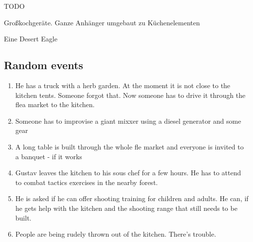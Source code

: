 \begin{npcBox}[title=Gustav Müller]
    \begin{stressSection}
    \end{stressSection}
    \begin{tabularx}{\textwidth}{ XX }
    \end{tabularx}

    \begin{consequences}
    \item {}
    \item {}
    \item {}
    \end{consequences}

    \begin{npcDescription}
    TODO
    \end{npcDescription}


    \begin{equipment}
    \item Großkochgeräte. Ganze Anhänger umgebaut zu Küchenelementen
    \item Eine Desert Eagle
    \end{equipment}
\end{npcBox}


\subsection{Random events}

\begin{enumerate}
\item He has a truck with a herb garden. At the moment it is not close to the kitchen tents. Someone forgot that. Now someone has to drive it through the flea market to the kitchen.
\item Someone has to improvise a giant mixxer using a diesel generator and some gear
\item A long table is built through the whole fle market and everyone is invited to a banquet - if it works
\item Gustav leaves the kitchen to his sous chef for a few hours. He has to attend to combat tactics exercises in the nearby forest.
\item He is asked if he can offer shooting training for children and adults. He can, if he gets help with the kitchen and the shooting range that still needs to be built.
\item People are being rudely thrown out of the kitchen. There's trouble.
\end{enumerate}

